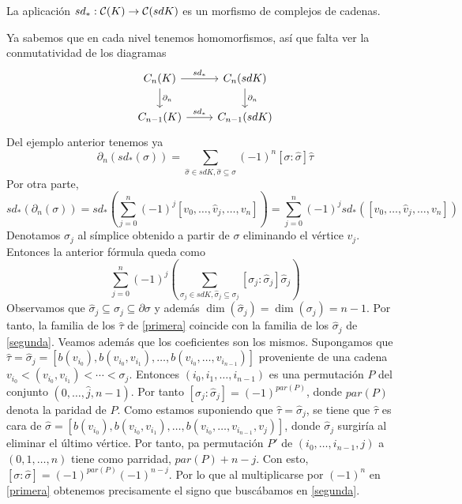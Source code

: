 \documentclass[HS.tex]{subfiles}
\begin{document}
\begin{prop}
La aplicación $sd_*:\mathcal{C}(K)\to\mathcal{C}(sdK)$ es un morfismo de complejos de cadenas.
\end{prop}
\begin{dem}
Ya sabemos que en cada nivel tenemos homomorfismos, así que falta ver la conmutatividad de los diagramas
\[
\begin{tikzcd}
C_n(K)\arrow[r,"sd_*"]\arrow[d, "\partial_n"] & C_n(sdK)\arrow[d, "\partial_n"]\\
C_{n-1}(K)\arrow[r, "sd_*"] & C_{n-1}(sdK)
\end{tikzcd}
\]
Del ejemplo anterior tenemos ya 
\begin{equation}\label{primera}
\partial_n(sd_*(\sigma))=\sum_{\hat{\sigma}\in sdK,\hat{\sigma}\subseteq\sigma}(-1)^n[\sigma:\hat{\sigma}]\hat{\tau}
\end{equation}
Por otra parte, 
\[
sd_*(\partial_n(\sigma))=sd_*\left(\sum_{j=0}^n(-1)^j[v_0,\dots, \hat{v}_j, \dots, v_n]\right)=\sum_{j=0}^n(-1)^jsd_*([v_0,\dots, \hat{v}_j, \dots, v_n])
\]
Denotamos $\sigma_j$ al símplice obtenido a partir de $\sigma$ eliminando el vértice $v_j$. Entonces la anterior fórmula queda como
\begin{equation}\label{segunda}
\sum_{j=0}^n(-1)^j\left(\sum_{\sigma_j\in sdK,\hat{\sigma}_j\subseteq\sigma_j}[\sigma_j:\hat{\sigma}_j]\hat{\sigma}_j\right)
\end{equation}
Observamos que $\hat{\sigma}_j\subseteq\sigma_j\subseteq\partial\sigma$ y además $\dim(\hat{\sigma}_j)=\dim(\sigma_j)=n-1$. Por tanto, la familia de los $\hat{\tau}$ de \ref{primera} coincide con la familia de los $\hat{\sigma}_j$ de \ref{segunda}. Veamos además que los coeficientes son los mismos. Supongamos que $\hat{\tau}=\hat{\sigma}_j=[b(v_{i_0}),b(v_{i_0}, v_{i_1}), \dots, b(v_{i_0},\dots, v_{i_{n-1}})]$ proveniente de una cadena $v_{i_0}<(v_{i_0}, v_{i_1})<\cdots<\sigma_j$. Entonces $(i_0,i_1,\dots, i_{n-1})$ es una permutación $P$ del conjunto $(0,\dots, \hat{j}, n-1)$. Por tanto $[\sigma_j:\hat{\sigma}_j]=(-1)^{par(P)}$, donde $par(P)$ denota la paridad de $P$. Como estamos suponiendo que $\hat{\tau}=\hat{\sigma}_j$, se tiene que $\hat{\tau}$ es cara de $\hat{\sigma}=[b(v_{i_0}),b(v_{i_0}, v_{i_1}), \dots, b(v_{i_0},\dots, v_{i_{n-1}}, v_j)]$, donde $\hat{\sigma}_j$ surgiría al eliminar el último vértice. Por tanto, pa permutación $P'$ de $(i_0,\dots, i_{n-1}, j)$ a $(0,1,\dots, n)$ tiene como parridad, $par(P)+n-j$. Con esto, $[\sigma:\hat{\sigma}]=(-1)^{par(P)}(-1)^{n-j}$. Por lo que al multiplicarse por $(-1)^n$ en \ref{primera} obtenemos precisamente el signo que buscábamos en \ref{segunda}. 
\QED
\end{dem}
\end{document}
